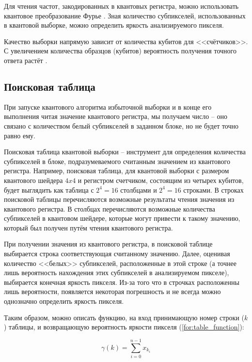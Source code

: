 Для чтения частот, закодированных в квантовых регистра, можно использовать квантовое преобразование Фурье \cite{PQC}. Зная количество субпикселей, использованных в квантовой выборке, можно определить яркость анализируемого пикселя.

Качество выборки напрямую зависит от количества кубитов для <<счётчиков>>. С увеличением количества образцов (кубитов) вероятность получения точного ответа растёт \cite{PQC}.

\subsection{Поисковая таблица}

При запуске квантового алгоритма избыточной выборки и в конце его выполнения читая значение квантового регистра, мы получаем число -- оно связано с количеством белый субпикселей в заданном блоке, но не будет точно равно ему. 

Поисковая таблица квантовой выборки -- инструмент для определения количества субпикселей в блоке, подразумеваемого считанным значением из квантового регистра. Например, поисковая таблица, для квантовой выборки с размером квантового шейдера $4x4$ и регистром счетчиком, состоящим из четырех кубитов, будет выглядить как таблица с $2^4 = 16$ столбцами и $2^4 = 16$ строками. В строках поисковой таблицы перечисляются возможные результаты чтения значения из квантового регистра. В столбцах перечисляются возможные количества  субпикселей в квантовом шейдере, которые могут привести к такому значению, который был получен путём чтения квантового регистра.

При получении значения из квантового регистра, в поисковой таблице выбирается строка соответствующая считанному значению. Далее, оценивая количество <<белых>> субпикселей, расположенные в этой строке (а точнее лишь вероятность нахождения этих субпикселей в анализируемом пикселе), выбирается конечная яркость пикселя. Из-за того что в строчках расположенны лишь вероятности, появляется некоторая погрешность и не всегда можно  однозначно определить яркость пикселя.

Таким образом, можно описать функцию, на вход принимающую номер строки ($k$) таблицы, и возвращающую вероятность яркости пикселя (\ref{for:table_function}):

\begin{equation}
	\label{for:table_function}
	\gamma(k) = \sum_{i=0}^{n - 1} x_{k_i}
\end{equation}


